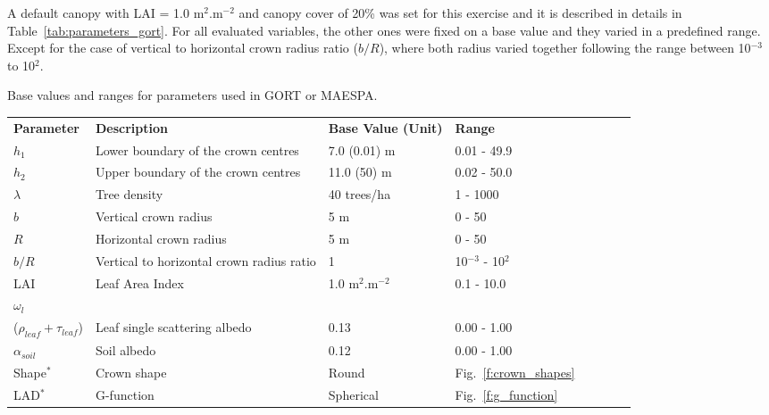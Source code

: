 \documentclass[a4paper,11pt]{report}
\begin{document}
A default canopy with LAI = 1.0 m$^2$.m$^{-2}$ and canopy cover of 20\% was set for this exercise and it is described in details in Table~\ref{tab:parameters_gort}. For all evaluated variables, the other ones were fixed on a base value and they varied in a predefined range. Except for the case of vertical to horizontal crown radius ratio ($b/R$), where both radius varied together following the range between 10$^{-3}$ to 10$^2$.

\begin{threeparttable}
\centering
\caption{Base values and ranges for parameters used in GORT or MAESPA.}
\begin{tabular}{lP{0.20\textwidth} lP{0.25\textwidth} lP{0.25\textwidth} lP{0.25\textwidth}}
     \hline
     \hline
\textbf{Parameter}   & \textbf{Description} & \textbf{Base Value (Unit)} & \textbf{Range} \\
\noalign{\smallskip}\hline
$h_1$          & Lower boundary of the crown centres       & 7.0  (0.01) m & 0.01 - 49.9 \\
$h_2$          & Upper boundary of the crown centres       & 11.0  (50) m & 0.02 - 50.0 \\
$\lambda$         & Tree density                              & 40 trees/ha &  1 - 1000\\
$b$            & Vertical crown radius                     & 5 m & 0 - 50\\ 
$R$            & Horizontal crown radius                   & 5 m &  0 - 50\\
$b/R$           & Vertical to horizontal crown radius ratio & 1 & 10$^{-3}$ - 10$^2$\\
LAI            & Leaf Area Index                           & 1.0 m$^2$.m$^{-2}$ &  0.1 - 10.0\\
$\omega_l$ \\ ($\rho_{leaf} + \tau_{leaf}$)          & Leaf single scattering albedo             & 0.13 &  0.00 - 1.00\\
$\alpha_{soil}$  & Soil albedo                               & 0.12 & 0.00 - 1.00\\ 
Shape$^*$           & Crown shape                               & Round & Fig.~\ref{f:crown_shapes} \\
LAD$^*$             & G-function                                & Spherical & Fig.~\ref{f:g_function}\\

\end{tabular}
\end{threeparttable}
\end{document}
